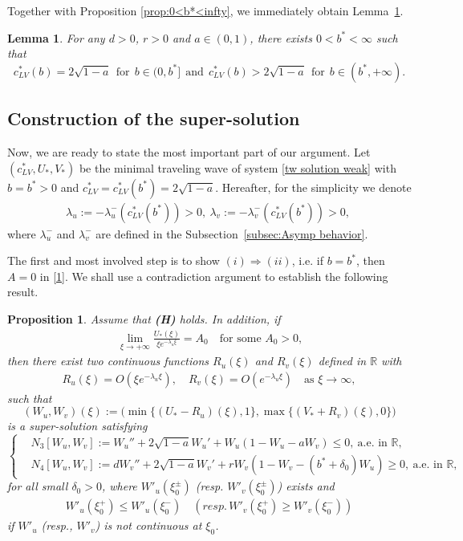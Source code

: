\documentclass[11pt,a4paper]{article}
\newtheorem{lemma}[theorem]{\textbf{Lemma}}
\newtheorem{proposition}[theorem]{\textbf{Proposition}}
\numberwithin{equation}{section}
\numberwithin{figure}{section}
\newcommand\bea{\begin{eqnarray}}
\newcommand\eea{\end{eqnarray}}
\newcommand\beaa{\begin{eqnarray*}}
\newcommand\eeaa{\end{eqnarray*}}
\begin{document}
Together with Proposition \ref{prop:0<b*<infty},
we immediately obtain Lemma~\ref{lm: existence b*}. 
\begin{lemma}\label{lm: existence b*}
For any $d>0$, $r>0$ and $a\in(0,1)$, there exists $0<b^*<\infty$  such that
\begin{equation*}
c_{LV}^{*}(b)=2\sqrt{1-a}\ \ \mbox{for}\ \ b\in(0,b^*]\ \  \mbox{and}\ \  c_{LV}^{*}(b)>2\sqrt{1-a} \ \ \mbox{for}\ \  b\in(b^*,+\infty).
\end{equation*}
\end{lemma}


\subsection{Construction of the super-solution}


\medskip

Now, we are ready to state the most important part of our argument. Let $(c_{LV}^{*}, U_*,V_*)$ be the minimal traveling wave of system \eqref{tw solution weak} with $b=b^*>0$
and $c_{LV}^{*}=c_{LV}^{*}(b^*)=2\sqrt{1-a}$.
Hereafter, for the simplicity we denote
\beaa
\lambda_u:=-\lambda_u^-(c_{LV}^{*}(b^*))>0,\ \lambda_v:=-\lambda_v^-(c_{LV}^{*}(b^*))>0,\
\eeaa
 where
$\lambda_u^-$ and $\lambda_v^-$ are defined in the Subsection~\ref{subsec:Asymp behavior}.

The first and most involved step is to show $(i)\Rightarrow (ii)$, i.e. if $b=b^*$, then $A=0$ in \eqref{1}. We shall use a contradiction argument to establish the following result.
\begin{proposition}\label{Prop-supersol-system}
Assume that {\bf(H)} holds. In addition, if
\bea\label{AS-U-infty-for-contradiction}
\lim_{\xi\rightarrow+\infty}\frac{U_{*}(\xi)}{\xi e^{-\lambda_u\xi}}=A_0\quad \mbox{for some $A_0>0$,}
\eea
then there exist two continuous functions $R_u(\xi)$ and $R_v(\xi)$
defined in $\mathbb{R}$ with
\bea\label{decay rate of Ru Rv}
R_u(\xi)=O(\xi e^{-\lambda_u\xi}),\quad R_v(\xi)=O(e^{-\lambda_u\xi}) \quad \mbox{as $\xi\to\infty$},
\eea
such that 
$$(W_u,W_v)(\xi):=\Big(\min\{(U_*-R_u)(\xi),1\},\max\{(V_*+R_v)(\xi),0\}\Big)$$
is a super-solution satisfying%
\begin{equation}\label{tw super solution system}
\left\{
\begin{aligned}
&N_3[W_u,W_v]:=W_u''+2\sqrt{1-a}W_u'+W_u(1-W_u-aW_v)\le0,\ \mbox{a.e. in $\mathbb{R}$},\\
&N_4[W_u,W_v]:=dW_v''+2\sqrt{1-a}W_v'+rW_v(1-W_v-(b^*+\delta_0)W_u)\ge 0,\ \mbox{a.e. in $\mathbb{R}$},
\end{aligned}
\right.
\end{equation}
for all small $\delta_0>0$, where
$W'_u(\xi_0^{\pm})$
(resp. $W'_v(\xi_0^{\pm})$) exists and
\beaa
W'_u(\xi_0^+)\leq W'_u(\xi_0^-)\quad (resp.\, W'_v(\xi_0^+)\geq W'_v(\xi_0^-))
\eeaa
if  $W'_u$ (resp., $W'_v$) is not continuous at $\xi_0$.
\end{proposition}
\end{document}
